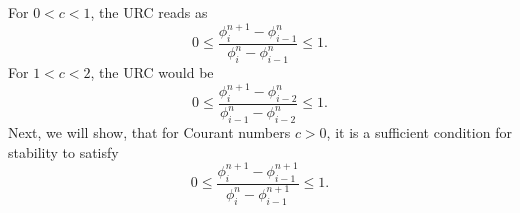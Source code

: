 \documentclass[../thesis.tex]{subfiles}
\begin{document}
For \(0 < c < 1\), the URC reads as
\begin{equation}
    0
    \leq
    \frac{\phi_{i}^{n+1} - \phi_{i-1}^{n}}{\phi_{i}^{n} - \phi_{i-1}^{n}}
    \leq
    1.
\end{equation}
For \(1 < c < 2\), the URC would be
\begin{equation}
    0
    \leq
    \frac{\phi_{i}^{n+1} - \phi_{i-2}^{n}}{\phi_{i-1}^{n} - \phi_{i-2}^{n}}
    \leq
    1.
\end{equation}
Next, we will show, that for Courant numbers \(c > 0\),
it is a sufficient condition for stability to satisfy
\begin{equation}\label{eqn: upwind-rage-condition - large c}
    0
    \leq
    \frac{\phi_{i}^{n+1} - \phi_{i-1}^{n+1}}
    {\phi_{i}^{n} - \phi_{i-1}^{n+1}}
    \leq
    1.
\end{equation}
\end{document}
